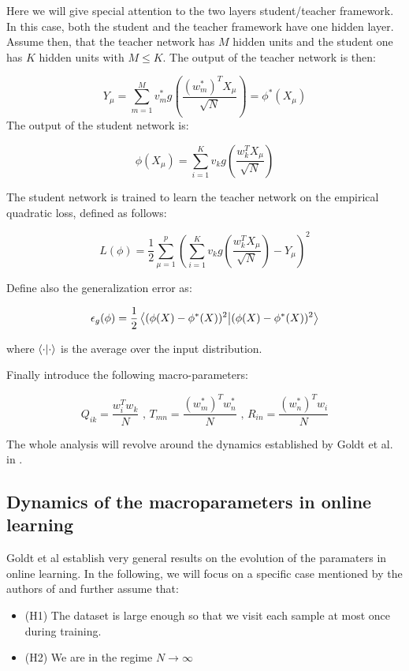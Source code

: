 Here we will give special attention to the two layers student/teacher framework. In this case, both the student and the teacher framework have one hidden layer. Assume then, that the teacher network has $M$ hidden units and the student one has $K$ hidden units with $M \leq K$. The output of the teacher network is then:

\begin{equation*}
Y_\mu = \sum \limits_{m=1}^M v_m^* g(\dfrac{(w_m^{*})^T X_\mu}{\sqrt{N}}) = \phi^{*}(X_\mu) 
\end{equation*}  
The output of the student network is: 

\begin{equation*}
 \phi(X_\mu) = \sum \limits_{i=1}^K v_k g(\dfrac{w_k^T X_\mu}{\sqrt{N}})
\end{equation*}

The student network is trained to learn the teacher network on the empirical quadratic loss, defined as follows:

$$ L(\phi) = \dfrac{1}{2}\sum \limits_{\mu = 1}^p (\sum \limits_{i=1}^K v_k g(\dfrac{w_k^T X_\mu}{\sqrt{N}})-Y_\mu)^2$$

Define also the generalization error as: 

$$\epsilon_g (\phi) = \dfrac{1}{2}\braket{(\phi(X)- \phi^*(X))^2}$$

where $\braket{\cdot}$ is the average over the input distribution.

Finally introduce the following macro-parameters:

\[ Q_{ik} = \dfrac{w_i^Tw_k}{N} \text{ , }  T_{mn} = \dfrac{(w_m^*)^Tw_n^*}{N} \text{ , }  R_{in} =\dfrac{(w_n^*)^Tw_i}{N}  \]

The whole analysis will revolve around the dynamics established by Goldt et al. in \cite{goldt_dynamics_2020} .

\subsection{Dynamics of the macroparameters in online learning} \label{sec:dynamics}

Goldt et al establish very general results on the evolution of the paramaters in online learning. In the following, we will focus on a specific case mentioned by the authors of \cite{goldt_dynamics_2019} and further assume that:

\begin{itemize} \label{list:hypothesis}
    \item (H1) The dataset is large enough so that we visit each sample at most once during training.
    \item (H2) We are in the regime $N \rightarrow \infty$
\end{itemize}

